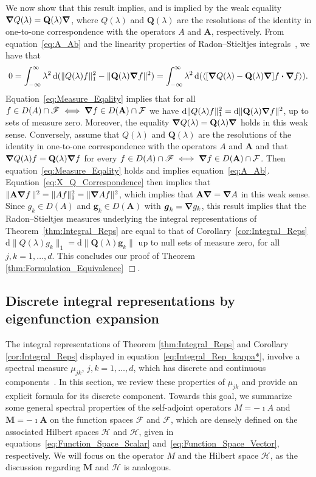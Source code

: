\documentclass[leqno,onefignum,onetabnum]{siamltex1213}
\newcommand{\thmref}[1]{Theorem~\ref{#1}}
\newcommand{\corref}[1]{Corollary~\ref{#1}}
\renewcommand{\d}{\mathrm{d}}
\newcommand{\Mb}{\mathbf{M}}
\newcommand{\Ab}{\mathbf{A}}
\newcommand{\Qb}{\mathbf{Q}}
\newcommand{\Hc}{\mathcal{H}}
\newcommand{\Fc}{\mathcal{F}}
\newcommand{\Hs}{\mathscr{H}}
\newcommand{\Fs}{\mathscr{F}}
\newcommand\bnabla{\mbox{\boldmath${\nabla}$}}
\providecommand\bcdot{\boldsymbol{\cdot}}
\newcommand{\vecg}{\boldsymbol{g}}
\begin{document}
We now show that this result implies, and is implied by the weak
equality $\bnabla Q(\lambda)=\Qb(\lambda)\bnabla $, where
$Q(\lambda)$ and $\Qb(\lambda)$ are the resolutions of the identity in one-to-one
correspondence with the operators $A$ and $\Ab$, respectively. From
equation~\eqref{eq:A_Ab} and the linearity properties of
Radon--Stieltjes integrals~\cite{Stone:64}, we have that   
%
\begin{align}\label{eq:Measure_Eqality}
  0=\int_{-\infty}^\infty\lambda^2\,\d(\|Q(\lambda)f\|_1^2-\|\Qb(\lambda)\bnabla f\|^2)
   =\int_{-\infty}^\infty\lambda^2\,\d(\langle[\bnabla Q(\lambda)-\Qb(\lambda)\bnabla ]f\bcdot\bnabla f\rangle).
\end{align}
%
Equation~\eqref{eq:Measure_Eqality} implies that for all
$f\in D(A)\cap\Fs\iff\bnabla f\in D(\Ab)\cap\Fc$ we have
$\d\|Q(\lambda)f\|_1^2=\d\|\Qb(\lambda)\bnabla f\|^2$, up to sets of measure
zero. Moreover, the equality $\bnabla Q(\lambda)=\Qb(\lambda)\bnabla $ holds
in this weak sense. Conversely, assume that $Q(\lambda)$ and 
$\Qb(\lambda)$ are the resolutions of the identity in one-to-one
correspondence with the operators $A$ and $\Ab$ and that $\bnabla
Q(\lambda)f=\Qb(\lambda)\bnabla f$ for every $f\in D(A)\cap\Fs\iff\bnabla f\in D(\Ab)\cap\Fc$. Then
equation~\eqref{eq:Measure_Eqality} holds and implies
equation~\eqref{eq:A_Ab}. Equation~\eqref{eq:X_Q_Correspondence} then
implies that $\|\Ab\bnabla f\,\|^2=\|Af\|_1^2=\|\bnabla Af\|^2$, which
implies that $\Ab\bnabla =\bnabla A$ in this weak sense. Since 
$g_k\in D(A)$ and $\vecg_k\in D(\Ab)$ with $\vecg_k=\bnabla g_k$, this result implies
that the Radon--Stieltjes measures underlying the integral
representations of \thmref{thm:Integral_Reps} are equal to that of
\corref{cor:Integral_Reps} $\d\| Q(\lambda)g_k\|_1=\d\|\Qb(\lambda)\vecg_k\|$ up to
null sets of measure zero, for all $j,k=1,\ldots,d$. This concludes our
proof of Theorem \ref{thm:Formulation_Equivalence} $\Box$.     










\subsection{Discrete integral representations by eigenfunction
  expansion} \label{sec:Eig_Funct_Exp}  
%
The integral representations of Theorem \ref{thm:Integral_Reps} and
Corollary \ref{cor:Integral_Reps} 
displayed in equation~\eqref{eq:Integral_Rep_kappa*},  involve a
spectral measure $\mu_{jk}$, $j,k=1,\ldots,d$, which has discrete and
continuous components~\cite{Reed-1980,Stone:64}. In this section, we
review these properties of $\mu_{jk}$ and provide an explicit formula
for its discrete component. Towards this goal, 
we summarize some general spectral properties of the self-adjoint
operators $M=-\imath A$ and $\Mb=-\imath\Ab$ on the function spaces $\Fs$
and $\Fc$, which are densely defined on the associated Hilbert spaces $\Hs$
and $\Hc$, given in equations~\eqref{eq:Function_Space_Scalar}
and~\eqref{eq:Function_Space_Vector}, respectively. We will focus on the
operator $M$ and the Hilbert space $\Hs$, as the discussion regarding
$\Mb$ and $\Hc$ is analogous. 
\end{document}
